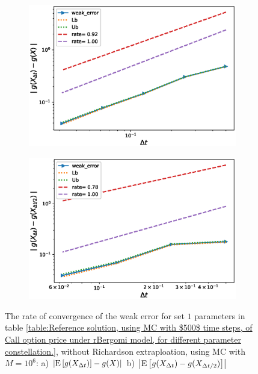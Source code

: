 \documentclass[11pt]{article}
\newcommand{\expt}[1]{\mathrm{E}\left[#1\right]}
\begin{document}
\begin{figure}[h!]
	\centering
	\begin{subfigure}{.4\textwidth}
		\centering
		\includegraphics[width=1\linewidth]{./figures/rBergomi_weak_error_rates/without_richardson/H_043/weak_convergence_order_Bergomi_H_043_K_1_M_10_6_CI_relative}
		\caption{}
		\label{fig:sub3}
	\end{subfigure}%
	\begin{subfigure}{.4\textwidth}
		\centering
		\includegraphics[width=1\linewidth]{./figures/rBergomi_weak_error_rates/without_richardson/H_043/weak_convergence_order_differences_Bergomi_H_043_K_1_M_10_6_CI_relative}
		\caption{}
		\label{fig:sub4}
	\end{subfigure}
	
	\caption{The rate of convergence of the weak error for set $1$ parameters in table \ref{table:Reference solution, using MC with $500$ time steps, of Call option price under rBergomi model, for different parameter constellation.}, without Richardson extraploation, using MC with $M=10^6$: a) $\abs{\expt{g(X_{\Delta t})}-g(X)}$  b) $\abs{\expt{g(X_{\Delta t})-g(X_{\Delta t/2})}}$ }
	\label{fig:Weak_rate_H_043_without_rich}
\end{figure}
\end{document}
